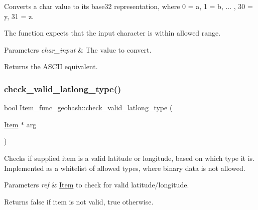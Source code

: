 Converts a char value to it\textquotesingle{}s base32 representation, where 0 = a, 1 = b, ... , 30 = y, 31 = z.

The function expects that the input character is within allowed range.


\begin{DoxyParams}{Parameters}
{\em char\+\_\+input} & The value to convert.\\
\hline
\end{DoxyParams}
\begin{DoxyReturn}{Returns}
the A\+S\+C\+II equivalent. 
\end{DoxyReturn}
\mbox{\label{classItem__func__geohash_a644fc7124d8c5332ed23a8519226f287}} 
\subsubsection{\texorpdfstring{check\+\_\+valid\+\_\+latlong\+\_\+type()}{check\_valid\_latlong\_type()}}
{\footnotesize\ttfamily bool Item\+\_\+func\+\_\+geohash\+::check\+\_\+valid\+\_\+latlong\+\_\+type (\begin{DoxyParamCaption}\item[{\mbox{\hyperlink{classItem}{Item}} $\ast$}]{arg }\end{DoxyParamCaption})}

Checks if supplied item is a valid latitude or longitude, based on which type it is. Implemented as a whitelist of allowed types, where binary data is not allowed.


\begin{DoxyParams}{Parameters}
{\em ref} & \mbox{\hyperlink{classItem}{Item}} to check for valid latitude/longitude. \\
\hline
\end{DoxyParams}
\begin{DoxyReturn}{Returns}
false if item is not valid, true otherwise. 
\end{DoxyReturn}
\mbox{\label{classItem__func__geohash_a3f7bb8e49f769efc0a9a70d5b35bd13c}} 
